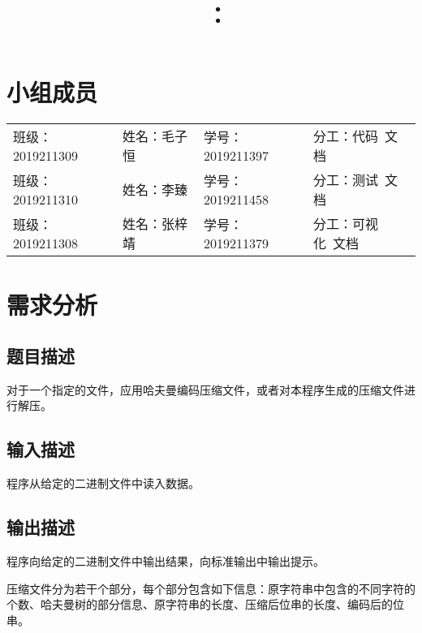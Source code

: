 \documentclass{article}
\title{\hmwkClass\ ：\hmwkTitle}
\author{\hmwkAuthorName}
\begin{document}
\maketitle

\section*{小组成员}

\setlength{\tabcolsep}{9mm}
{
    \begin{table}[htbp]
        \centering
        \begin{tabular}{llll}
            班级：2019211309 & 姓名：毛子恒 & 学号：2019211397 & 分工：代码\ 文档   \\

            班级：2019211310 & 姓名：李臻   & 学号：2019211458 & 分工：测试\ 文档   \\

            班级：2019211308 & 姓名：张梓靖 & 学号：2019211379 & 分工：可视化\ 文档 \\
        \end{tabular}
    \end{table}
}

\tableofcontents
\newpage

\section{需求分析}

\subsection{题目描述}

对于一个指定的文件，应用哈夫曼编码压缩文件，或者对本程序生成的压缩文件进行解压。

\subsection{输入描述}

程序从给定的二进制文件中读入数据。

\subsection{输出描述}

程序向给定的二进制文件中输出结果，向标准输出中输出提示。

压缩文件分为若干个部分，每个部分包含如下信息：原字符串中包含的不同字符的个数、哈夫曼树的部分信息、原字符串的长度、压缩后位串的长度、编码后的位串。
\end{document}
